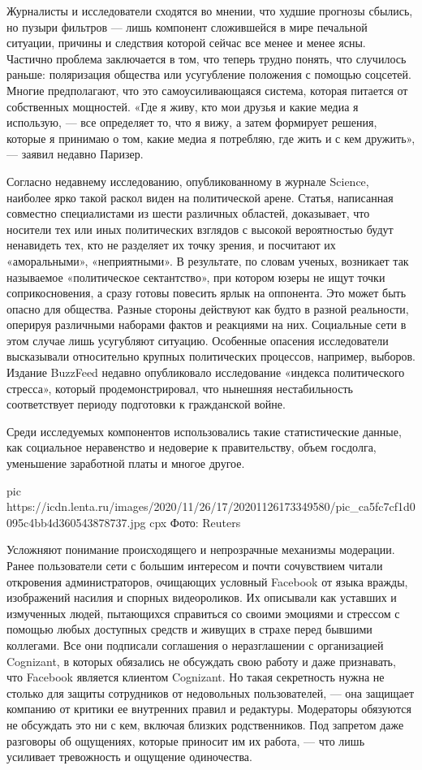 Журналисты и исследователи сходятся во мнении, что худшие прогнозы сбылись, но
пузыри фильтров — лишь компонент сложившейся в мире печальной ситуации, причины
и следствия которой сейчас все менее и менее ясны. Частично проблема
заключается в том, что теперь трудно понять, что случилось раньше: поляризация
общества или усугубление положения с помощью соцсетей. Многие предполагают, что
это самоусиливающаяся система, которая питается от собственных мощностей. «Где
я живу, кто мои друзья и какие медиа я использую, — все определяет то, что я
вижу, а затем формирует решения, которые я принимаю о том, какие медиа я
потребляю, где жить и с кем дружить», — заявил недавно Паризер.

Согласно недавнему исследованию, опубликованному в журнале Science, наиболее
ярко такой раскол виден на политической арене. Статья, написанная совместно
специалистами из шести различных областей, доказывает, что носители тех или
иных политических взглядов с высокой вероятностью будут ненавидеть тех, кто не
разделяет их точку зрения, и посчитают их «аморальными», «неприятными». В
результате, по словам ученых, возникает так называемое «политическое
сектантство», при котором юзеры не ищут точки соприкосновения, а сразу готовы
повесить ярлык на оппонента. Это может быть опасно для общества. Разные стороны
действуют как будто в разной реальности, оперируя различными наборами фактов и
реакциями на них. Социальные сети в этом случае лишь усугубляют ситуацию.
Особенные опасения исследователи высказывали относительно крупных политических
процессов, например, выборов. Издание BuzzFeed недавно опубликовало
исследование «индекса политического стресса», который продемонстрировал, что
нынешняя нестабильность соответствует периоду подготовки к гражданской войне.

Среди исследуемых компонентов использовались такие статистические данные, как
социальное неравенство и недоверие к правительству, объем госдолга, уменьшение
заработной платы и многое другое.

\ifcmt
pic https://icdn.lenta.ru/images/2020/11/26/17/20201126173349580/pic_ca5fc7cf1d0095c4bb4d360543878737.jpg
cpx Фото: Reuters
\fi

Усложняют понимание происходящего и непрозрачные механизмы модерации. Ранее
пользователи сети с большим интересом и почти сочувствием читали откровения
администраторов, очищающих условный Facebook от языка вражды, изображений
насилия и спорных видеороликов. Их описывали как уставших и измученных людей,
пытающихся справиться со своими эмоциями и стрессом с помощью любых доступных
средств и живущих в страхе перед бывшими коллегами. Все они подписали
соглашения о неразглашении с организацией Cognizant, в которых обязались не
обсуждать свою работу и даже признавать, что Facebook является клиентом
Cognizant. Но такая секретность нужна не столько для защиты сотрудников от
недовольных пользователей, — она защищает компанию от критики ее внутренних
правил и редактуры. Модераторы обязуются не обсуждать это ни с кем, включая
близких родственников. Под запретом даже разговоры об ощущениях, которые
приносит им их работа, — что лишь усиливает тревожность и ощущение одиночества.

